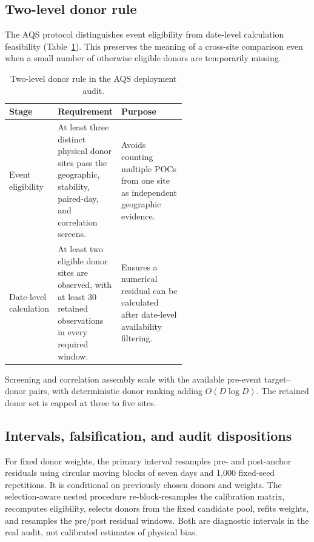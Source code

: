 \subsection{Two-level donor rule}

The AQS protocol distinguishes event eligibility from date-level calculation
feasibility (Table~\ref{tab:donor-levels}). This preserves the meaning of a
cross-site comparison even when a small number of otherwise eligible donors
are temporarily missing.

\begin{table}[tbp]
\centering
\caption{Two-level donor rule in the AQS deployment audit.}
\label{tab:donor-levels}
\small
\begin{tabularx}{\linewidth}{@{}p{0.27\linewidth}p{0.31\linewidth}X@{}}
\toprule
Stage & Requirement & Purpose \\
\midrule
Event eligibility & At least three distinct physical donor sites pass the
geographic, stability, paired-day, and correlation screens. & Avoids counting
multiple POCs from one site as independent geographic evidence. \\
Date-level calculation & At least two eligible donor sites are observed, with
at least 30 retained observations in every required window. & Ensures a
numerical residual can be calculated after date-level availability filtering. \\
\bottomrule
\end{tabularx}
\end{table}

Screening and correlation assembly scale with the available pre-event
target--donor pairs, with deterministic donor ranking adding
$O(D\log D)$. The retained donor set is capped at three to five sites.

\subsection{Intervals, falsification, and audit dispositions}

For fixed donor weights, the primary interval resamples pre- and post-anchor
residuals using circular moving blocks of seven days and 1,000 fixed-seed
repetitions. It is conditional on previously chosen donors and weights. The
selection-aware nested procedure re-block-resamples the calibration matrix,
recomputes eligibility, selects donors from the fixed candidate pool, refits
weights, and resamples the pre/post residual windows. Both are diagnostic
intervals in the real audit, not calibrated estimates of physical bias.

